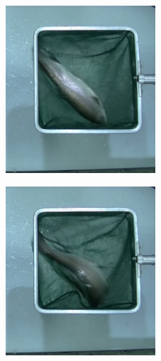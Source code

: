 \begin{enumerate}
    \begin{figure}[H]
        \centering
            \begin{subfigure}[b]{\textwidth}
                \centering
                \begin{subfigure}[b]{0.25\textwidth}
                    \centering
                    \includegraphics[width=0.8\textwidth]{images/6/SinOptical2.png}
                    \label{fig:SinOptical2}
                \end{subfigure}
                \begin{subfigure}[b]{0.25\textwidth}
                    \centering
                    \includegraphics[width=0.8\textwidth]{images/6/SinOptical3.png}

\end{subfigure}
\end{subfigure}
\end{figure}
\end{enumerate}
